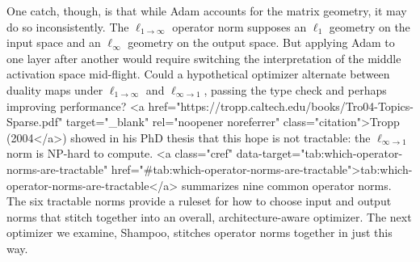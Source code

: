 One catch, though, is that while Adam accounts for the matrix geometry, it may do so inconsistently. The $\ell_{1 \to \infty}$ operator norm supposes an $\ell_1$ geometry on the input space and an $\ell_\infty$ geometry on the output space. But applying Adam to one layer after another would require switching the interpretation of the middle activation space mid-flight. Could a hypothetical optimizer alternate between duality maps under $\ell_{1 \to \infty}$ and $\ell_{\infty \to 1}$, passing the type check and perhaps improving performance? <a href="https://tropp.caltech.edu/books/Tro04-Topics-Sparse.pdf" target="_blank" rel="noopener noreferrer" class="citation">Tropp (2004</a>) showed in his PhD thesis that this hope is not tractable: the $\ell_{\infty \to 1}$ norm is NP-hard to compute. <a class="cref" data-target="tab:which-operator-norms-are-tractable" href="#tab:which-operator-norms-are-tractable">tab:which-operator-norms-are-tractable</a> summarizes nine common operator norms. The six tractable norms provide a ruleset for how to choose input and output norms that stitch together into an overall, architecture-aware optimizer. The next optimizer we examine, Shampoo, stitches operator norms together in just this way.

